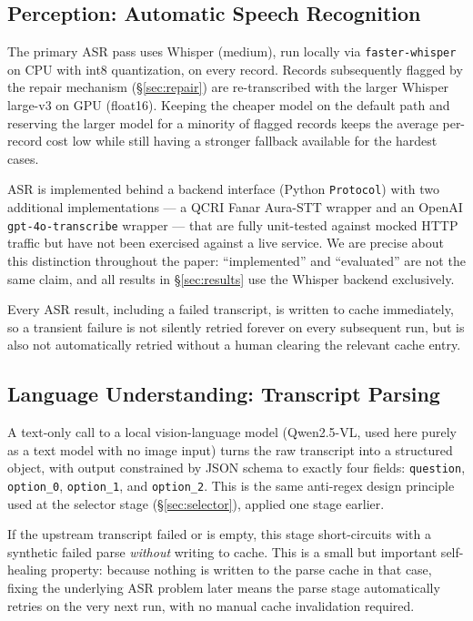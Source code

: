 \documentclass[11pt]{article}
\begin{document}
\subsection{Perception: Automatic Speech Recognition}
\label{sec:asr}

The primary ASR pass uses Whisper (medium), run locally via \texttt{faster-whisper} on CPU with int8 quantization, on every record. Records subsequently flagged by the repair mechanism (\S\ref{sec:repair}) are re-transcribed with the larger Whisper large-v3 on GPU (float16). Keeping the cheaper model on the default path and reserving the larger model for a minority of flagged records keeps the average per-record cost low while still having a stronger fallback available for the hardest cases.

ASR is implemented behind a backend interface (Python \texttt{Protocol}) with two additional implementations --- a QCRI Fanar Aura-STT wrapper and an OpenAI \texttt{gpt-4o-transcribe} wrapper --- that are fully unit-tested against mocked HTTP traffic but have not been exercised against a live service. We are precise about this distinction throughout the paper: ``implemented'' and ``evaluated'' are not the same claim, and all results in \S\ref{sec:results} use the Whisper backend exclusively.

Every ASR result, including a failed transcript, is written to cache immediately, so a transient failure is not silently retried forever on every subsequent run, but is also not automatically retried without a human clearing the relevant cache entry.

\subsection{Language Understanding: Transcript Parsing}
\label{sec:parsing}

A text-only call to a local vision-language model (Qwen2.5-VL, used here purely as a text model with no image input) turns the raw transcript into a structured object, with output constrained by JSON schema to exactly four fields: \texttt{question}, \texttt{option\_0}, \texttt{option\_1}, and \texttt{option\_2}. This is the same anti-regex design principle used at the selector stage (\S\ref{sec:selector}), applied one stage earlier.

If the upstream transcript failed or is empty, this stage short-circuits with a synthetic failed parse \emph{without} writing to cache. This is a small but important self-healing property: because nothing is written to the parse cache in that case, fixing the underlying ASR problem later means the parse stage automatically retries on the very next run, with no manual cache invalidation required.
\end{document}
